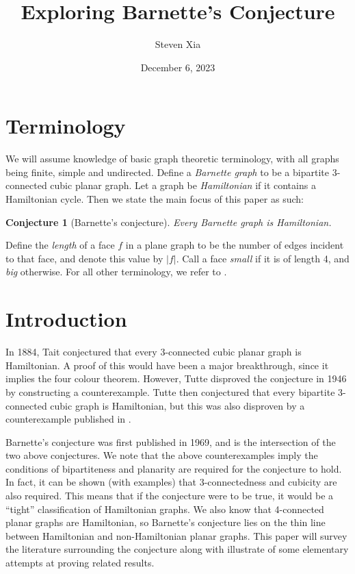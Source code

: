 \documentclass{scrartcl}
\title{Exploring Barnette's Conjecture}
\author{Steven Xia}
\date{December 6, 2023}
\theoremstyle{definition}
\theoremstyle{plain}
\newtheorem{conjecture}{Conjecture}
\begin{document}
\maketitle

\section*{Terminology}

We will assume knowledge of basic graph theoretic terminology, with all graphs being finite, simple
and undirected.
Define a \textit{Barnette graph} to be a bipartite 3-connected cubic planar graph.
Let a graph be \textit{Hamiltonian} if it contains a Hamiltonian cycle.
Then we state the main focus of this paper as such:

\begin{conjecture}[Barnette's conjecture]
    Every Barnette graph is Hamiltonian.
\end{conjecture}

Define the \textit{length} of a face $f$ in a plane graph to be the number of edges incident to
that face, and denote this value by $\lvert f\rvert$.
Call a face \textit{small} if it is of length 4, and \textit{big} otherwise.
For all other terminology, we refer to \cite{Diestel2017-lj}.

\section*{Introduction}

In 1884, Tait \cite{Tait1884-zt} conjectured that every 3-connected cubic planar graph is
Hamiltonian.
A proof of this would have been a major breakthrough, since it implies the four colour theorem.
However, Tutte \cite{Tutte1946-mn} disproved the conjecture in 1946 by constructing a
counterexample.
Tutte \cite{Tutte1971-rb} then conjectured that every bipartite 3-connected cubic graph is
Hamiltonian, but this was also disproven by a counterexample published in \cite{Bondy1976-db}.

Barnette's conjecture \cite{Tutte1969-mj} was first published in 1969, and is the intersection of
the two above conjectures.
We note that the above counterexamples imply the conditions of bipartiteness and planarity are
required for the conjecture to hold.
In fact, it can be shown (with examples) that 3-connectedness and cubicity are also required.
This means that if the conjecture were to be true, it would be a ``tight'' classification of
Hamiltonian graphs.
We also know \cite{Tutte1956-dq} that 4-connected planar graphs are Hamiltonian, so Barnette's
conjecture lies on the thin line between Hamiltonian and non-Hamiltonian planar graphs.
This paper will survey the literature surrounding the conjecture along with illustrate of some
elementary attempts at proving related results.
\end{document}
